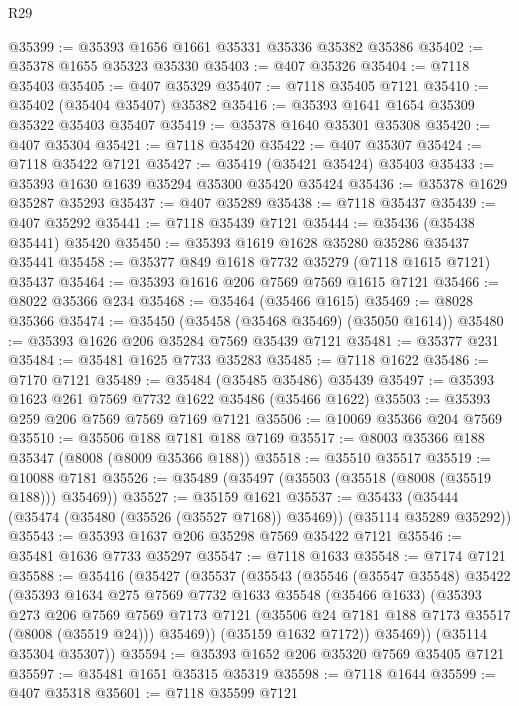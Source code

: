 \begin{lexlean}{R29}
\begin{coremodule}
@35399 := @35393 @1656 @1661 @35331 @35336 @35382 @35386
@35402 := @35378 @1655 @35323 @35330
@35403 := @407 @35326
@35404 := @7118 @35403
@35405 := @407 @35329
@35407 := @7118 @35405 @7121
@35410 := @35402 (@35404 @35407) @35382
@35416 := @35393 @1641 @1654 @35309 @35322 @35403 @35407
@35419 := @35378 @1640 @35301 @35308
@35420 := @407 @35304
@35421 := @7118 @35420
@35422 := @407 @35307
@35424 := @7118 @35422 @7121
@35427 := @35419 (@35421 @35424) @35403
@35433 := @35393 @1630 @1639 @35294 @35300 @35420 @35424
@35436 := @35378 @1629 @35287 @35293
@35437 := @407 @35289
@35438 := @7118 @35437
@35439 := @407 @35292
@35441 := @7118 @35439 @7121
@35444 := @35436 (@35438 @35441) @35420
@35450 := @35393 @1619 @1628 @35280 @35286 @35437 @35441
@35458 := @35377 @849 @1618 @7732 @35279 (@7118 @1615 @7121) @35437
@35464 := @35393 @1616 @206 @7569 @7569 @1615 @7121
@35466 := @8022 @35366 @234
@35468 := @35464 (@35466 @1615)
@35469 := @8028 @35366
@35474 := @35450 (@35458 (@35468 @35469) (@35050 @1614))
@35480 := @35393 @1626 @206 @35284 @7569 @35439 @7121
@35481 := @35377 @231
@35484 := @35481 @1625 @7733 @35283
@35485 := @7118 @1622
@35486 := @7170 @7121
@35489 := @35484 (@35485 @35486) @35439
@35497 := @35393 @1623 @261 @7569 @7732 @1622 @35486 (@35466 @1622)
@35503 := @35393 @259 @206 @7569 @7569 @7169 @7121
@35506 := @10069 @35366 @204 @7569
@35510 := @35506 @188 @7181 @188 @7169
@35517 := @8003 @35366 @188 @35347 (@8008 (@8009 @35366 @188))
@35518 := @35510 @35517
@35519 := @10088 @7181
@35526 := @35489 (@35497 (@35503 (@35518 (@8008 (@35519 @188))) @35469))
@35527 := @35159 @1621
@35537 := @35433 (@35444 (@35474 (@35480 (@35526 (@35527 @7168)) @35469)) (@35114 @35289 @35292))
@35543 := @35393 @1637 @206 @35298 @7569 @35422 @7121
@35546 := @35481 @1636 @7733 @35297
@35547 := @7118 @1633
@35548 := @7174 @7121
@35588 := @35416
    (@35427
      (@35537
        (@35543
          (@35546
            (@35547 @35548)
            @35422
            (@35393
              @1634
              @275
              @7569
              @7732
              @1633
              @35548
              (@35466 @1633)
              (@35393
                @273
                @206
                @7569
                @7569
                @7173
                @7121
                (@35506 @24 @7181 @188 @7173 @35517 (@8008 (@35519 @24)))
                @35469))
            (@35159 @1632 @7172))
          @35469))
      (@35114 @35304 @35307))
@35594 := @35393 @1652 @206 @35320 @7569 @35405 @7121
@35597 := @35481 @1651 @35315 @35319
@35598 := @7118 @1644
@35599 := @407 @35318
@35601 := @7118 @35599 @7121

\end{coremodule}
\end{lexlean}
